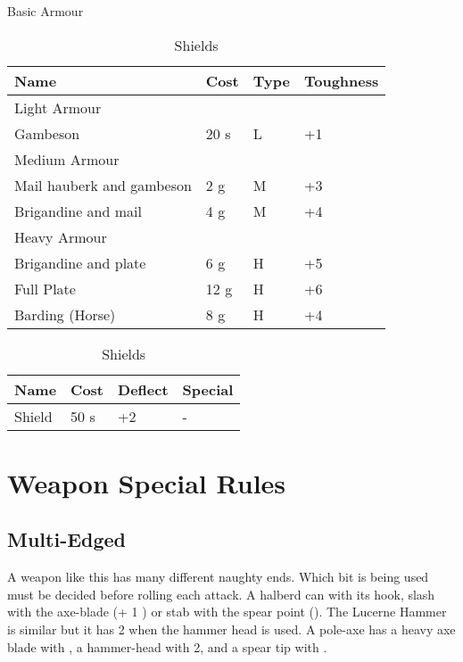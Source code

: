 \begin{table}[ht]
	\centering
	\caption{Basic Armour}
	\begin{tabular}{|l|l|l|l|}
		\hline
		Name  & Cost & Type & Toughness\\
		\hline
		Light Armour & & &  \\
		\hline
		Gambeson & 20 s & L & +1  \\
		\hline
		Medium Armour & & &  \\
		\hline
		Mail hauberk and gambeson & 2 g & M & +3   \\ 
		Brigandine and mail  & 4 g & M & +4  \\
		\hline
		Heavy Armour & & &  \\
		\hline
		Brigandine and plate & 6 g & H & +5 \\
		Full Plate  & 12 g & H & +6  \\
		\hline
		Barding (Horse)& 8 g & H & +4 \\
		\hline
	\end{tabular}
	\caption{Shields}
	\begin{tabular}{|l|l|l|l|}
		\hline
		Name & Cost & Deflect & Special\\   
		\hline
		Shield & 50 s & +2 & - \\
		\hline
	\end{tabular}
\end{table}





\section{Weapon Special Rules}

\subsection{Multi-Edged}
A weapon like this has many different naughty ends. Which bit is being used must be decided before rolling each attack. A halberd can  with its hook, slash with the axe-blade (+ 1 ) or stab with the spear point (). The Lucerne Hammer is similar but it has  2 when the hammer head is used. A pole-axe has a heavy axe blade with , a hammer-head with  2, and a spear tip with .

